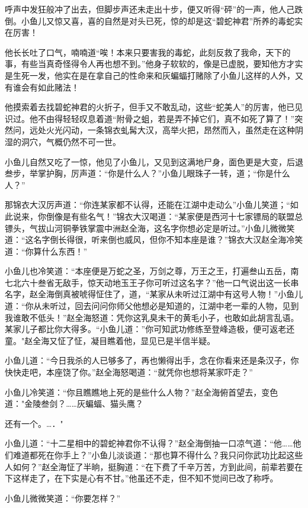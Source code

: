 \documentclass[12pt,oneside]{book}
\begin{document}
呼声中发狂般冲了出去，但脚步声还未走出十步，便又听得``砰''的一声，他人己跌倒。小鱼儿又惊又喜，喜的自然是对头已死，惊的却是这``碧蛇神君''所养的毒蛇实在厉害！

他长长吐了口气，喃喃道``唉！本来只要害我的毒蛇，此刻反救了我命，天下的事，有些当真奇怪得令人再也想不到。''他身子软软的，像是已虚脱，要知他方才实是生死一发，他实在是在拿自己的性命来和灰蝙蝠打赌除了小鱼儿这样的人外，又有谁会有如此赌法！

他摸索着去找碧蛇神君的火折子，但手又不敢乱动，这些``蛇美人''的厉害，他已见识过。他不由得轻轻叹息着道``附骨之蛆，若是弄不掉它们，真不如死了算了！''突然问，远处火光闪动，一条锦衣虬髯大汉，高举火把，昂然而入，虽然走在这种阴湿的洞穴，气概仍然不可一世。

小鱼儿自然又吃了一惊，他见了小鱼儿，又见到这满地尸身，面色更是大变，后退叁步，举掌护胸，厉声道：``你是什么人？''小鱼儿眼珠子一转，道；``你是什么人？''

那锦衣大汉厉声道：``你连某家都不认得，还能在江湖中走动么''小鱼儿笑道；``如此说来，你倒像是有些名气！''锦衣大汉喝道：``某家便是西河十七家镖局的联盟总镖头，气拔山河铜拳铁掌震中洲赵全海，这名字你想必定是听过。''小鱼儿微微笑道：``这名字倒长得很，听来倒也威风，但你不知本座是谁？''锦衣大汉赵全海冷笑道：``你算什么东西！''

小鱼儿也冷笑道：``本座便是万蛇之圣，万剑之尊，万王之王，打遍叁山五岳，南七北六十叁省无敌手，惊天动地玉王子你可听过这名字？''他一口气说出这一长串名字，赵全海倒真被唬得怔住了，道，``某家从未听过江湖中有这号人物！''小鱼儿道：``你从未听过，回去问问你师父他想必是知道的，江湖中老一辈的人物，见到我谁敢不低头！''赵全海怒道：凭你这乳臭未干的黄毛小子，也敢如此胡言乱语。某家儿子都比你大得多。``小鱼儿道：''你可知武功修练至登峰造极，便可返老还童。"赵全海又怔了怔，凝目瞧着他，显见已是半信半疑。

小鱼儿道：``今日我杀的人已够多了，再也懒得出手，念在你看来还是条汉子，你快快走吧，本座饶了你。''赵全海怒喝道：``就凭你也想将某家吓走？''

小鱼儿冷笑道：``你且瞧瞧地上死的是些什么人物？''赵全海俯首望去，变色道："金陵叁剑？\ldots\ldots 灰蝙蝠、猫头鹰？

还有一个。\ldots．"

小鱼儿道：``十二星相中的碧蛇神君你不认得？''赵全海倒抽一口凉气道：``他\ldots\ldots 他们难道都死在你手上？''小鱼儿淡谈道：``那也算不得什么？我只问你武功比起这些人如何？''赵全海怔了半晌，挺胸道：``在下费了千辛万苦，方到此间，前辈若要在下这样走了，在下实是心有不甘。''他虽还不走，但不知不觉间已改了称呼。

小鱼儿微微笑道：``你要怎样？''
\end{document}
